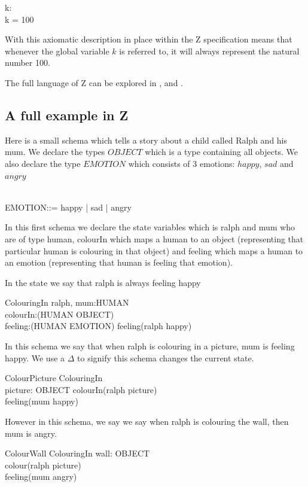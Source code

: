\begin{axdef}
k: \nat \\
\where
k = 100
\end{axdef}

With this axiomatic description in place within the Z specification means that
whenever the global variable $k$ is referred to, it will always represent the
natural number 100.

The full language of Z can be explored in \cite{spiveyreferencemanual},
\cite{essenceofz} and \cite{Woodcock:1996:UZS:235337}.

\subsection{A full example in Z}
Here is a small schema which tells a story about a child called Ralph and his
mum. We declare the types $OBJECT$ which is a type containing all objects. We
also declare the type $EMOTION$ which consists of 3 emotions: $happy$, $sad$ and
$angry$

\begin{zed}
[OBJECT] \\
EMOTION::= happy | sad | angry
\end{zed}

In this first schema we declare the state variables which is ralph and mum who
are of type human, colourIn which maps a human to an object (representing that
particular human is colouring in that object) and feeling which maps a human to
an emotion (representing that human is feeling that emotion).

In the state we say that ralph is always feeling happy
\begin{schema}{ColouringIn}
ralph, mum:HUMAN \\
colourIn:(HUMAN \pfun OBJECT) \\
feeling:(HUMAN \pfun EMOTION)
\where
feeling(ralph \mapsto happy)
\end{schema}

In this schema we say that when ralph is colouring in a picture, mum is feeling
happy. We use a $\Delta$ to signify this schema changes the current state.
\begin{schema}{ColourPicture}
\Delta ColouringIn \\
picture: OBJECT 
\where
colourIn(ralph \mapsto picture) \\
feeling(mum \mapsto happy)
\end{schema}

However in this schema, we say we say when ralph is colouring the wall, then mum
is angry.
\begin{schema}{ColourWall}
\Delta ColouringIn wall: OBJECT \\
\where
colour(ralph \mapsto picture) \\
feeling(mum \mapsto angry)
\end{schema}

